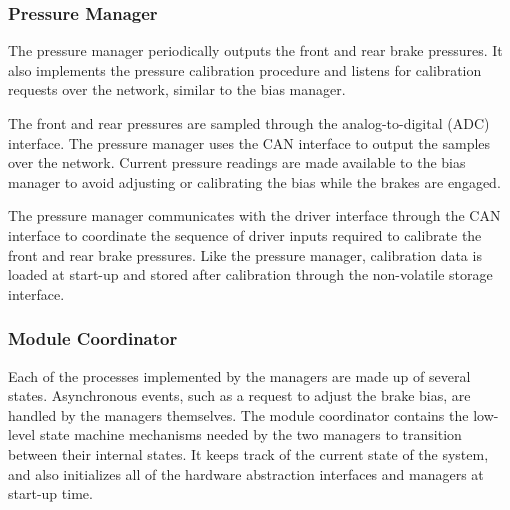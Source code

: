 \subsubsection{Pressure Manager}

The pressure manager periodically outputs the front and rear brake pressures. It also implements the pressure calibration procedure and listens for calibration requests over the network, similar to the bias manager.

The front and rear pressures are sampled through the analog-to-digital (ADC) interface. The pressure manager uses the CAN interface to output the samples over the network. Current pressure readings are made available to the bias manager to avoid adjusting or calibrating the bias while the brakes are engaged.

The pressure manager communicates with the driver interface through the CAN interface to coordinate the sequence of driver inputs required to calibrate the front and rear brake pressures. Like the pressure manager, calibration data is loaded at start-up and stored after calibration through the non-volatile storage interface.

\subsubsection{Module Coordinator}

Each of the processes implemented by the managers are made up of several states. Asynchronous events, such as a request to adjust the brake bias, are handled by the managers themselves. The module coordinator contains the low-level state machine mechanisms needed by the two managers to transition between their internal states. It keeps track of the current state of the system, and also initializes all of the hardware abstraction interfaces and managers at start-up time.  

